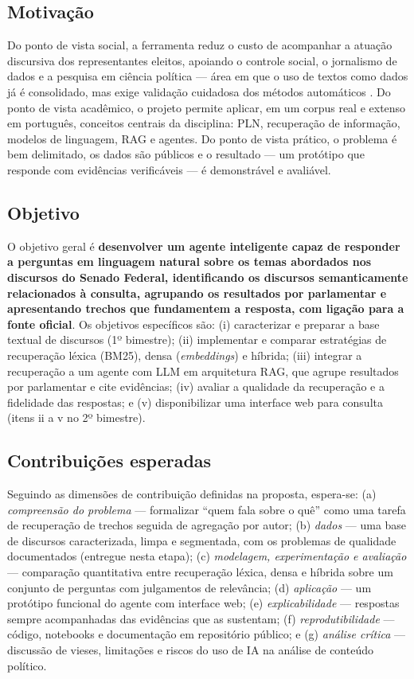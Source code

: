 \documentclass[12pt]{article}
\begin{document}
\subsection{Motivação}

Do ponto de vista social, a ferramenta reduz o custo de acompanhar a atuação discursiva dos
representantes eleitos, apoiando o controle social, o jornalismo de dados e a pesquisa em ciência
política --- área em que o uso de textos como dados já é consolidado, mas exige validação
cuidadosa dos métodos automáticos \cite{grimmer2013}. Do ponto de vista acadêmico, o projeto
permite aplicar, em um corpus real e extenso em português, conceitos centrais da disciplina: PLN,
recuperação de informação, modelos de linguagem, RAG e agentes. Do ponto de vista prático, o
problema é bem delimitado, os dados são públicos e o resultado --- um protótipo que responde com
evidências verificáveis --- é demonstrável e avaliável.

\subsection{Objetivo}

O objetivo geral é \textbf{desenvolver um agente inteligente capaz de responder a perguntas em
linguagem natural sobre os temas abordados nos discursos do Senado Federal, identificando os
discursos semanticamente relacionados à consulta, agrupando os resultados por parlamentar e
apresentando trechos que fundamentem a resposta, com ligação para a fonte oficial}. Os objetivos
específicos são:
(i) caracterizar e preparar a base textual de discursos (1º bimestre);
(ii) implementar e comparar estratégias de recuperação léxica (BM25), densa (\textit{embeddings})
e híbrida;
(iii) integrar a recuperação a um agente com LLM em arquitetura RAG, que agrupe resultados por
parlamentar e cite evidências;
(iv) avaliar a qualidade da recuperação e a fidelidade das respostas; e
(v) disponibilizar uma interface web para consulta (itens ii a v no 2º bimestre).

\subsection{Contribuições esperadas}

Seguindo as dimensões de contribuição definidas na proposta, espera-se:
(a) \emph{compreensão do problema} --- formalizar ``quem fala sobre o quê'' como uma tarefa de
recuperação de trechos seguida de agregação por autor;
(b) \emph{dados} --- uma base de discursos caracterizada, limpa e segmentada, com os problemas de
qualidade documentados (entregue nesta etapa);
(c) \emph{modelagem, experimentação e avaliação} --- comparação quantitativa entre recuperação
léxica, densa e híbrida sobre um conjunto de perguntas com julgamentos de relevância;
(d) \emph{aplicação} --- um protótipo funcional do agente com interface web;
(e) \emph{explicabilidade} --- respostas sempre acompanhadas das evidências que as sustentam;
(f) \emph{reprodutibilidade} --- código, notebooks e documentação em repositório público; e
(g) \emph{análise crítica} --- discussão de vieses, limitações e riscos do uso de IA na análise de
conteúdo político.
\end{document}
